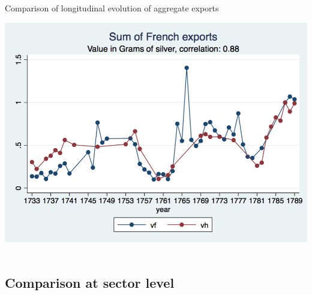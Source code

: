 \documentclass[12pt,a4paper,titlepage]{article}
\begin{document}
\begin{center}
\caption{Comparison of longitudinal evolution of aggregate exports}
\includegraphics[scale=.3]{long_evolution.png}\\~\\
\end{center}

\subsection{Comparison at sector level}
\end{document}
